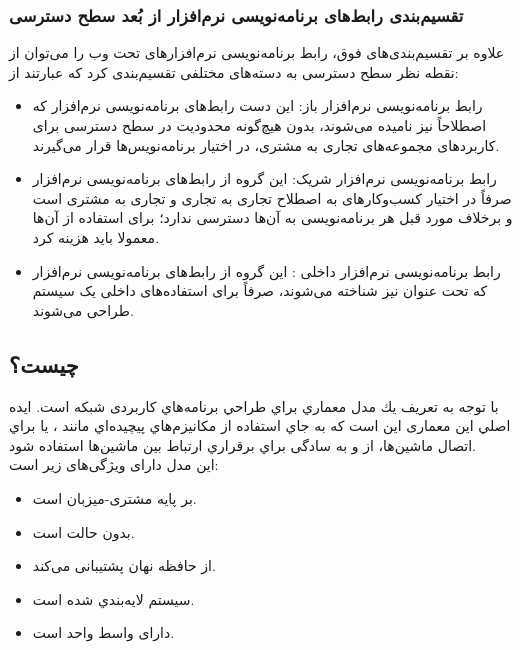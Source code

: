 {\subsubsection{تقسیم‌بندی رابط‌های برنامه‌نویسی نرم‌افزار از بُعد سطح دسترسی}
علاوه بر تقسیم‌بندی‌های فوق،‌ رابط برنامه‌نویسی نرم‌افزارهای تحت وب را می‌توان از نقطه نظر سطح دسترسی به دسته‌های مختلفی تقسیم‌بندی کرد که عبارتند از:
\begin{itemize}
	\item رابط برنامه‌نویسی نرم‌افزار باز: این دست رابط‌های برنامه‌نویسی نرم‌افزار که اصطلاحاً  نیز نامیده می‌شوند، بدون هیچ‌گونه محدودیت در سطح دسترسی برای کاربردهای مجموعه‌های تجاری به مشتری، در اختیار برنامه‌نویس‌ها قرار می‌گیرند.
	\item رابط برنامه‌نویسی نرم‌افزار شریک: این گروه از رابط‌های برنامه‌نویسی نرم‌افزار صرفاً در اختیار کسب‌وکارهای به اصطلاح تجاری به تجاری و تجاری به مشتری است و برخلاف مورد قبل هر برنامه‌نویسی به آن‌ها دسترسی ندارد؛ برای استفاده از آن‌ها معمولا باید هزینه کرد.
	\item رابط برنامه‌نویسی نرم‌افزار داخلی : این گروه از رابط‌های برنامه‌نویسی نرم‌افزار که تحت عنوان  نیز شناخته می‌شوند، صرفاً برای استفاده‌های داخلی یک سیستم طراحی می‌شوند.

\end{itemize}

\subsection{ چیست؟}
با توجه به تعریف \cite{REST}
 يك مدل معماري براي طراحي برنامه‌هاي كاربردی شبكه است. ايده اصلي این معماری اين است كه به جاي استفاده از مكانيزم‌هاي پيچيده‌اي مانند ،  يا  براي اتصال ماشين‌ها، از  و به سادگی براي برقراري ارتباط بين ماشين‌ها استفاده شود.\\
این مدل دارای ویژگی‌های زیر است: 
\begin{itemize}
	\item بر پایه مشتری-میزبان است.
	\item بدون حالت است.
	\item از حافظه نهان پشتیبانی می‌کند.
	\item سيستم لايه‌بندي شده است.
    \item دارای واسط واحد است.
\end{itemize}
 
}
